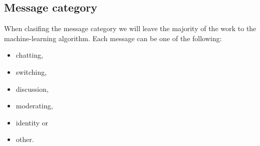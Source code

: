 \documentclass[11pt,a4paper]{article}
\newcommand{\taclpaper}{final version\xspace}
\newcommand{\taclpaper}{submission\xspace}
\begin{document}
\subsection{Message category}

When clasifing the message category we will leave the majority of the work to the machine-learning algorithm.
Each message can be one of the following:
\begin{itemize}
\item{chatting,}
\item{switching,}
\item{discussion,}
\item{moderating,}
\item{identity or}
\item{other.}
\end{itemize}


\end{document}
